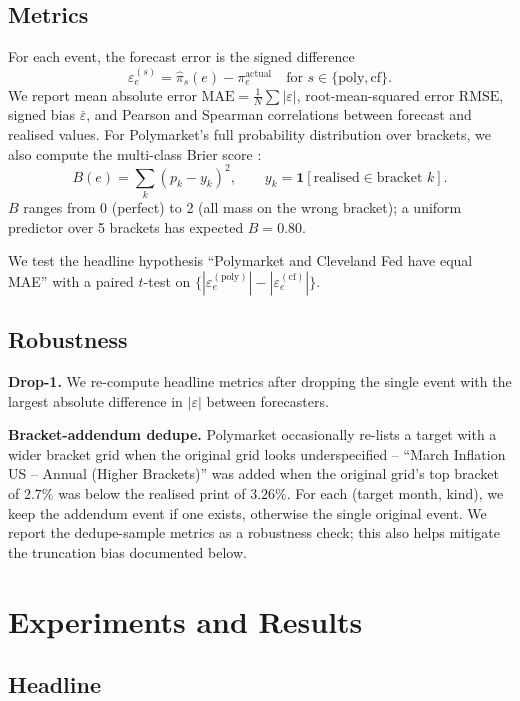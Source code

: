 \documentclass{article}
\begin{document}
\subsection{Metrics}

For each event, the forecast error is the signed difference
\[
\varepsilon^{(s)}_e = \hat{\pi}_s(e) - \pi^{\text{actual}}_e
\quad \text{for } s \in \{\text{poly}, \text{cf}\}.
\]
\noindent
We report mean absolute error
$\mathrm{MAE} = \tfrac{1}{N}\sum |\varepsilon|$,
root-mean-squared error $\mathrm{RMSE}$, signed bias
$\overline{\varepsilon}$, and Pearson and Spearman correlations
between forecast and realised values.  For Polymarket's full
probability distribution over brackets, we also compute the multi-class
Brier score \citep{brier1950verification}:
\[
B(e) = \sum_k (p_k - y_k)^2, \qquad
y_k = \mathbf{1}[\text{realised} \in \text{bracket } k].
\]
\noindent
$B$ ranges from 0 (perfect) to 2 (all mass on the wrong bracket); a
uniform predictor over 5 brackets has expected $B = 0.80$.

We test the headline hypothesis ``Polymarket and Cleveland Fed have
equal MAE'' with a paired $t$-test on $\{|\varepsilon^{(\text{poly})}_e|
- |\varepsilon^{(\text{cf})}_e|\}$.

\subsection{Robustness}

\textbf{Drop-1.}  We re-compute headline metrics after dropping the
single event with the largest absolute difference in $|\varepsilon|$
between forecasters.

\textbf{Bracket-addendum dedupe.}  Polymarket occasionally re-lists a
target with a wider bracket grid when the original grid looks
underspecified -- ``March Inflation US -- Annual (Higher Brackets)''
was added when the original grid's top bracket of $2.7\%$ was below
the realised print of $3.26\%$.  For each (target month, kind), we
keep the addendum event if one exists, otherwise the single original
event.  We report the dedupe-sample metrics as a robustness check;
this also helps mitigate the truncation bias documented below.

\section{Experiments and Results}

\subsection{Headline}
\end{document}
